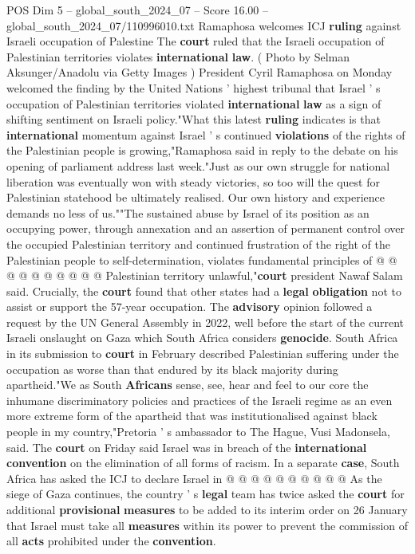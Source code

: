 \begin{textsample}{POS Dim 5 – global\_south\_2024\_07 – Score 16.00 – global\_south\_2024\_07/110996010.txt}  \label{ex:f5_pos_165}
Ramaphosa welcomes ICJ \textbf{ruling} against Israeli occupation of Palestine The \textbf{court} ruled that the Israeli occupation of Palestinian territories violates \textbf{international} \textbf{law}. ( Photo by Selman Aksunger/Anadolu via Getty Images ) President Cyril Ramaphosa on Monday welcomed the finding by the United Nations ' highest tribunal that Israel ' s occupation of Palestinian territories violated \textbf{international} \textbf{law} as a sign of shifting sentiment on Israeli policy."What this latest \textbf{ruling} indicates is that \textbf{international} momentum against Israel ' s continued \textbf{violations} of the rights of the Palestinian people is growing,"Ramaphosa said in reply to the debate on his opening of parliament address last week."Just as our own struggle for national liberation was eventually won with steady victories, so too will the quest for Palestinian statehood be ultimately realised.
Our own history and experience demands no less of us.""The sustained abuse by Israel of its position as an occupying power, through annexation and an assertion of permanent control over the occupied Palestinian territory and continued frustration of the right of the Palestinian people to self-determination, violates fundamental principles of @ @ @ @ @ @ @ @ @ @ Palestinian territory unlawful,"\textbf{court} president Nawaf Salam said.
Crucially, the \textbf{court} found that other states had a \textbf{legal} \textbf{obligation} not to assist or support the 57-year occupation.
The \textbf{advisory} opinion followed a request by the UN General Assembly in 2022, well before the start of the current Israeli onslaught on Gaza which South Africa considers \textbf{genocide}.
South Africa in its submission to \textbf{court} in February described Palestinian suffering under the occupation as worse than that endured by its black majority during apartheid."We as South \textbf{Africans} sense, see, hear and feel to our core the inhumane discriminatory policies and practices of the Israeli regime as an even more extreme form of the apartheid that was institutionalised against black people in my country,"Pretoria ' s ambassador to The Hague, Vusi Madonsela, said.
The \textbf{court} on Friday said Israel was in breach of the \textbf{international} \textbf{convention} on the elimination of all forms of racism.
In a separate \textbf{case}, South Africa has asked the ICJ to declare Israel in @ @ @ @ @ @ @ @ @ @ As the siege of Gaza continues, the country ' s \textbf{legal} team has twice asked the \textbf{court} for additional \textbf{provisional} \textbf{measures} to be added to its interim order on 26 January that Israel must take all \textbf{measures} within its power to prevent the commission of all \textbf{acts} prohibited under the \textbf{convention}.

\end{textsample}
